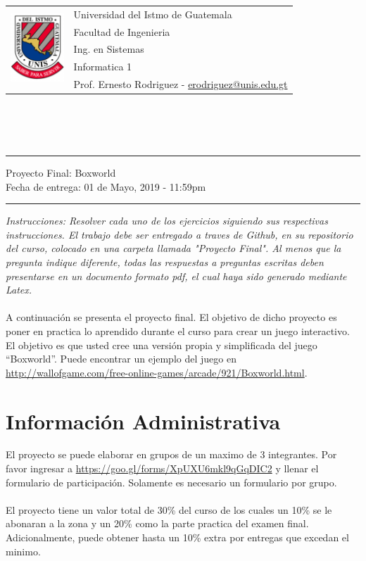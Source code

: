\documentclass{article}
\newcommand{\horrule}[1]{\rule{\linewidth}{#1}}
\begin{document}
\begin{tabular}{l l}
\multirow{5}{*}{\includegraphics[width=2cm]{../recursos/logo.png}} & Universidad del Istmo de Guatemala \\
 & Facultad de Ingenieria \\
 & Ing. en Sistemas \\
 & Informatica 1 \\
 & Prof. Ernesto Rodriguez - \href{mailto:erodriguez@unis.edu.gt}{erodriguez@unis.edu.gt} \\
\end{tabular}
\\\\\\

\begin{center}
        \horrule{0.5pt}
        \huge{Proyecto Final: Boxworld} \\
        \large{Fecha de entrega: 01 de Mayo, 2019 - 11:59pm} \\
        \horrule{1pt}
\end{center}

\emph{Instrucciones: Resolver cada uno de los ejercicios siguiendo sus respectivas
instrucciones. El trabajo debe ser entregado a traves de Github, en su repositorio del curso, colocado en una carpeta llamada "Proyecto Final".
Al menos que la pregunta indique diferente, todas las respuestas a preguntas escritas deben presentarse en
un documento formato pdf, el cual haya sido generado mediante Latex. }
\\\\
A continuaci\'on se presenta el proyecto final. El objetivo de dicho proyecto es poner
en practica lo aprendido durante el curso para crear un juego interactivo. El objetivo
es que usted cree una versi\'on propia y simplificada del juego ``Boxworld''. Puede
encontrar un ejemplo del juego en \url{http://wallofgame.com/free-online-games/arcade/921/Boxworld.html}.
\section*{Informaci\'on Administrativa}
El proyecto se puede elaborar en grupos de un maximo de 3 integrantes. Por favor ingresar
a \url{https://goo.gl/forms/XpUXU6mkl9qGqDIC2} y llenar el formulario de participaci\'on.
Solamente es necesario un formulario por grupo.
\\\\
El proyecto tiene un valor total de 30\% del curso de los cuales un 10\% se le abonaran
a la zona y un 20\% como la parte practica del examen final. Adicionalmente, puede
obtener hasta un 10\% extra por entregas que excedan el minimo.
\end{document}
